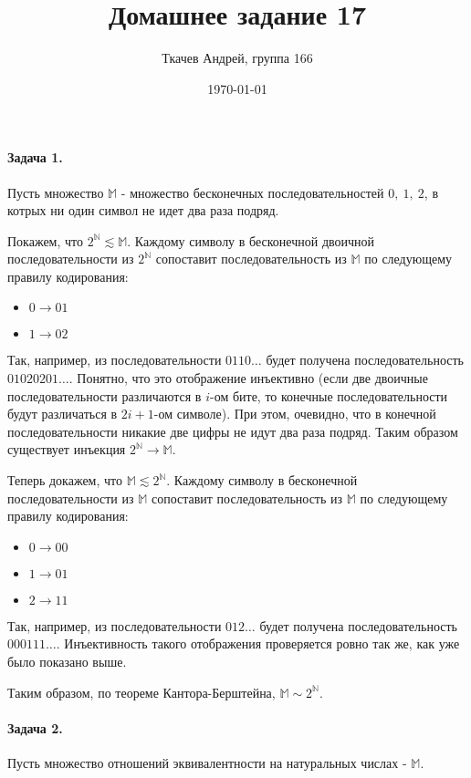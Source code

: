 \documentclass{article}
\title{Домашнее задание 17}
\author{Ткачев Андрей, группа 166}
\date{\today}
\newcommand{\N}{\mathbb{N}}
\newcommand{\M}{\mathbb{M}}
\newcommand{\conti}{2^{\N}}
\begin{document}
    \maketitle
    \paragraph{Задача 1.}
    Пусть множество $\M$ - множество бесконечных последовательностей $0,\ 1,\ 2$, в котрых ни один символ не идет два раза подряд.

    Покажем, что $\conti \apprle \M$. Каждому символу в бесконечной двоичной последовательности из $\conti$ сопоставит последовательность из $\M$ по следующему правилу кодирования:

    \begin{itemize}
        \item $0 \rightarrow 01$
        \item $1 \rightarrow 02$
    \end{itemize}

    Так, например, из последовательности $0110\ldots$ будет получена последовательность $01020201\ldots$. 
    Понятно, что это отображение инъективно (если две двоичные последовательности различаются в $i$-ом бите, то конечные последовательности будут различаться в $2i + 1$-ом символе). 
    При этом, очевидно, что в конечной последовательности никакие две цифры не идут два раза подряд. 
    Таким образом существует инъекция $\conti \rightarrow \M$.

    Теперь докажем, что $\M \apprle \conti$. Каждому символу в бесконечной последовательности из $\M$ сопоставит последовательность из $\M$ по следующему правилу кодирования:

    \begin{itemize}
        \item $0 \rightarrow 00$
        \item $1 \rightarrow 01$
        \item $2 \rightarrow 11$        
    \end{itemize}

     Так, например, из последовательности $012\ldots$ будет получена последовательность $000111\ldots$. Инъективность такого отображения проверяется ровно так же, как уже было показано выше. 

     Таким образом, по теореме Кантора-Берштейна, $\M \sim \conti$.

     \paragraph{Задача 2.}
     Пусть множество отношений эквивалентности на натуральных числах - $\M$.
\end{document}
